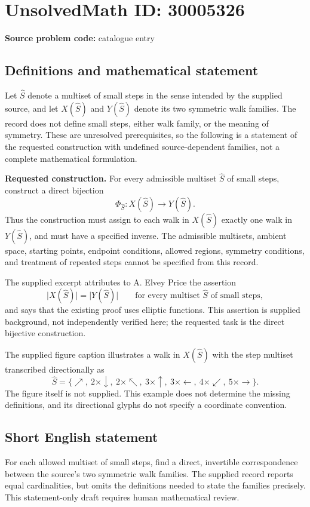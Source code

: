 \documentclass[11pt]{article}
\begin{document}
\section*{UnsolvedMath ID: 30005326}
\textbf{Source problem code:} catalogue entry
\subsection{Definitions and mathematical statement}
Let \(\widehat S\) denote a multiset of small steps in the sense intended by the supplied source, and let \(X(\widehat S)\) and \(Y(\widehat S)\) denote its two symmetric walk families. The record does not define small steps, either walk family, or the meaning of symmetry. These are unresolved prerequisites, so the following is a statement of the requested construction with undefined source-dependent families, not a complete mathematical formulation.

\textbf{Requested construction.} For every admissible multiset \(\widehat S\) of small steps, construct a direct bijection
\[
\Phi_{\widehat S}\colon X(\widehat S)\longrightarrow Y(\widehat S).
\]
Thus the construction must assign to each walk in \(X(\widehat S)\) exactly one walk in \(Y(\widehat S)\), and must have a specified inverse. The admissible multisets, ambient space, starting points, endpoint conditions, allowed regions, symmetry conditions, and treatment of repeated steps cannot be specified from this record.

The supplied excerpt attributes to A. Elvey Price the assertion
\[
\lvert X(\widehat S)\rvert=\lvert Y(\widehat S)\rvert
\qquad\text{for every multiset \(\widehat S\) of small steps},
\]
and says that the existing proof uses elliptic functions. This assertion is supplied background, not independently verified here; the requested task is the direct bijective construction.

The supplied figure caption illustrates a walk in \(X(\widehat S)\) with the step multiset transcribed directionally as
\[
\widehat S=\{\nearrow,\ 2\times\downarrow,\ 2\times\nwarrow,\ 3\times\uparrow,\ 3\times\leftarrow,\ 4\times\swarrow,\ 5\times\rightarrow\}.
\]
The figure itself is not supplied. This example does not determine the missing definitions, and its directional glyphs do not specify a coordinate convention.
\subsection{Short English statement}
For each allowed multiset of small steps, find a direct, invertible correspondence between the source's two symmetric walk families. The supplied record reports equal cardinalities, but omits the definitions needed to state the families precisely. This statement-only draft requires human mathematical review.
\end{document}
